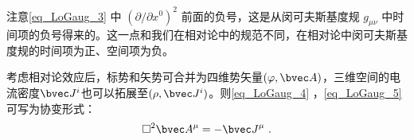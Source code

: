 注意\autoref{eq_LoGaug_3} 中 $(\partial/\partial x^0)^2$ 前面的负号，这是从闵可夫斯基度规 $g_{\mu\nu}$ 中时间项的负号得来的。这一点和我们在相对论中的规范不同，在相对论中闵可夫斯基度规的时间项为正、空间项为负。

考虑相对论效应后，标势和矢势可合并为四维势矢量$(\varphi,\bvec A)$，三维空间的电流密度$\bvec J^i$也可以拓展至$(\rho, \bvec J^i)$。则\autoref{eq_LoGaug_4} ，\autoref{eq_LoGaug_5} 可写为协变形式：
\begin{equation}
\square^2 \bvec A^{\mu}=-\bvec J^{\mu}~.
\end{equation}





